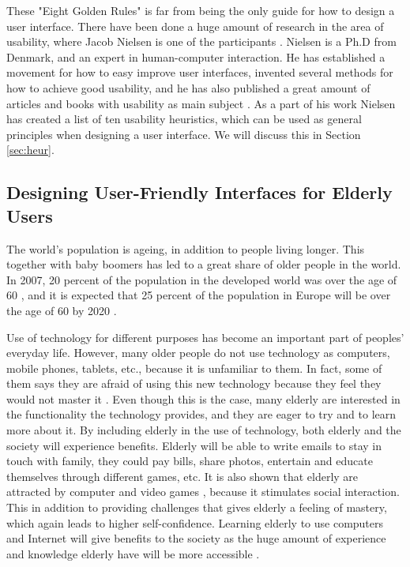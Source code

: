 These "Eight Golden Rules" is far from being the only guide for how to design a user interface. There have been done a huge amount of research in the area of usability, where Jacob Nielsen is one of the participants \cite{nielsen2005ten}. Nielsen is a Ph.D from Denmark, and an expert in human-computer interaction. He has established a movement for how to easy improve user interfaces, invented several methods for how to achieve good usability, and he has also published a great amount of articles and books with usability as main subject \cite{JNielsen}. As a part of his work Nielsen has created a list of ten usability heuristics, which can be used as general principles when designing a user interface\cite{nielsen2005ten}. We will discuss this in Section \ref{sec:heur}. 

\subsection{Designing User-Friendly Interfaces for Elderly Users}
\label{sec:designelderly}
The world's population is ageing, in addition to people living longer. This together with baby boomers has led to a great share of older people in the world. In 2007, 20 percent of the population in the developed world was over the age of 60 \cite{dickinson2007methods}, and it is expected that 25 percent of the population in Europe will be over the age of 60 by 2020 \cite{ijsselsteijn2007digital}. 

Use of technology for different purposes has become an important part of peoples' everyday life. However, many older people do not use technology as computers, mobile phones, tablets, etc., because it is unfamiliar to them. In fact, some of them says they are afraid of using this new technology because they feel they would not master it \cite{mmi}. Even though this is the case, many elderly are interested in the functionality the technology provides, and they are eager to try and to learn more about it. By including elderly in the use of technology, both elderly and the society will experience benefits. Elderly will be able to write emails to stay in touch with family, they could pay bills, share photos, entertain and educate themselves through different games, etc. It is also shown that elderly are attracted by computer and video games \cite{mmi} \cite{ijsselsteijn2007digital}, because it stimulates social interaction. This in addition to providing challenges that gives elderly a feeling of mastery, which again leads to higher self-confidence. Learning elderly to use computers and Internet will give benefits to the society as the huge amount of experience and knowledge elderly have will be more accessible \cite{mmi}. 

